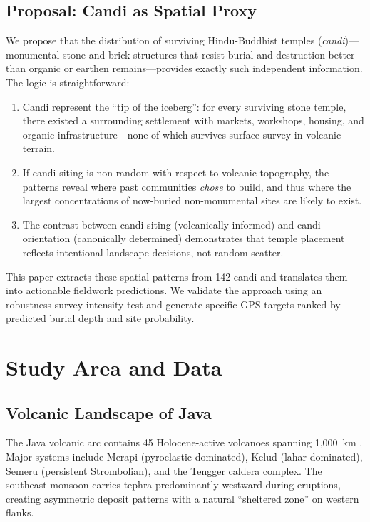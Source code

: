 \documentclass[12pt,a4paper]{article}
\begin{document}
\subsection{Proposal: Candi as Spatial Proxy}

We propose that the distribution of surviving Hindu-Buddhist temples (\emph{candi})---monumental stone and brick structures that resist burial and destruction better than organic or earthen remains---provides exactly such independent information. The logic is straightforward:

\begin{enumerate}
    \item Candi represent the ``tip of the iceberg'': for every surviving stone temple, there existed a surrounding settlement with markets, workshops, housing, and organic infrastructure---none of which survives surface survey in volcanic terrain.
    \item If candi siting is non-random with respect to volcanic topography, the patterns reveal where past communities \emph{chose} to build, and thus where the largest concentrations of now-buried non-monumental sites are likely to exist.
    \item The contrast between candi siting (volcanically informed) and candi orientation (canonically determined) demonstrates that temple placement reflects intentional landscape decisions, not random scatter.
\end{enumerate}

This paper extracts these spatial patterns from 142 candi and translates them into actionable fieldwork predictions. We validate the approach using an robustness survey-intensity test and generate specific GPS targets ranked by predicted burial depth and site probability.

\section{Study Area and Data}

\subsection{Volcanic Landscape of Java}

The Java volcanic arc contains 45 Holocene-active volcanoes spanning 1,000~km \citep{whitten1996, thouret1999}. Major systems include Merapi (pyroclastic-dominated), Kelud (lahar-dominated), Semeru (persistent Strombolian), and the Tengger caldera complex. The southeast monsoon carries tephra predominantly westward during eruptions, creating asymmetric deposit patterns with a natural ``sheltered zone'' on western flanks.
\end{document}

